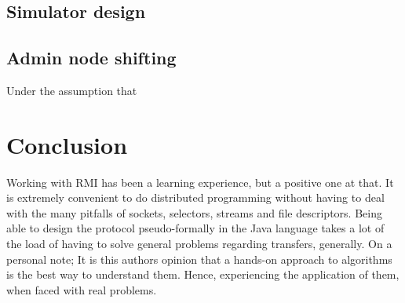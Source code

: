 \documentclass[10pt,a4paper]{article}
\begin{document}
\subsection{Simulator design}

\subsection{Admin node shifting}
Under the assumption that 

\section{Conclusion}
Working with RMI has been a learning experience, but a positive one at that. It is extremely convenient to do distributed programming without having to deal with the many pitfalls of sockets, selectors, streams and file descriptors. Being able to design the protocol pseudo-formally in the Java language takes a lot of the load of having to solve general problems regarding transfers, generally.
On a personal note; It is this authors opinion that a hands-on approach to algorithms is the best way to understand them. Hence, experiencing the application of them, when faced with real problems.
\end{document}
